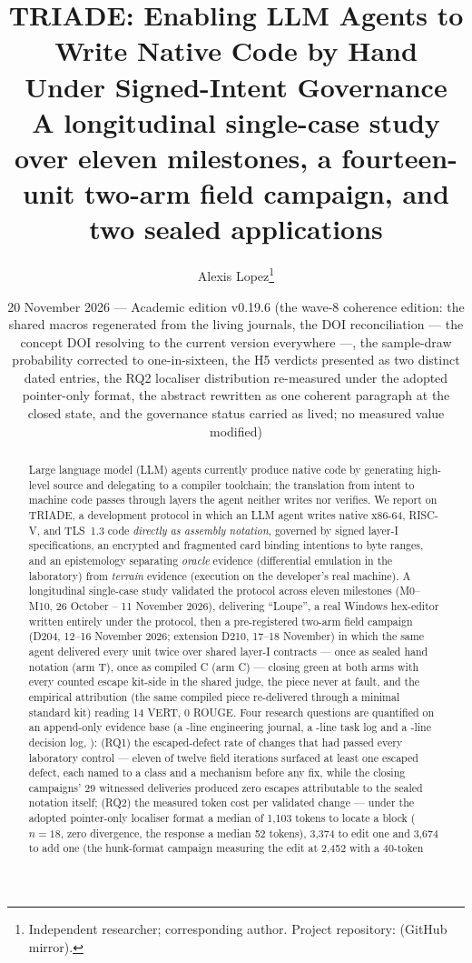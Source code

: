 \documentclass[11pt,a4paper]{article}
\title{\textbf{TRIADE: Enabling LLM Agents to Write Native Code by Hand\\
Under Signed-Intent Governance\\
\large A longitudinal single-case study over eleven milestones, a
fourteen-unit two-arm field campaign, and two sealed applications}}
\author{Alexis Lopez\thanks{Independent researcher; corresponding author.
Project repository: \code{alexisfrlopez-debug/triade} (GitHub mirror).}}
\date{20 November 2026 — Academic edition v0.19.6 (the wave-8 coherence edition: the shared macros regenerated from the living journals, the DOI reconciliation --- the concept DOI resolving to the current version everywhere ---, the sample-draw probability corrected to one-in-sixteen, the H5 verdicts presented as two distinct dated entries, the RQ2 localiser distribution re-measured under the adopted pointer-only format, the abstract rewritten as one coherent paragraph at the closed state, and the governance status carried as lived; no measured value modified)}
\begin{document}
\maketitle
\thispagestyle{fancy}

\begin{abstract}
\noindent Large language model (LLM) agents currently produce native code by
generating high-level source and delegating to a compiler toolchain; the
translation from intent to machine code passes through layers the agent
neither writes nor verifies. We report on TRIADE, a development protocol in
which an LLM agent writes native x86-64, RISC-V, and TLS~1.3 code
\emph{directly as assembly notation}, governed by signed layer-I
specifications, an encrypted and fragmented card binding intentions to byte
ranges, and an epistemology separating \emph{oracle} evidence (differential
emulation in the laboratory) from \emph{terrain} evidence (execution on the
developer's real machine). A longitudinal single-case study validated the
protocol across eleven milestones (M0--M10, 26 October -- 11 November 2026),
delivering ``Loupe'', a real Windows hex-editor written entirely under the
protocol, then a pre-registered two-arm field campaign (D204, 12--16
November 2026; extension D210, 17--18 November) in which the same agent
delivered every unit twice over shared layer-I contracts --- once as sealed
hand notation (arm T), once as compiled C (arm C) --- closing green at both
arms with every counted escape kit-side in the shared judge, the piece
never at fault, and the empirical attribution (the same compiled piece
re-delivered through a minimal standard kit) reading 14 VERT, 0 ROUGE.
Four research questions are quantified on an append-only evidence base
(a \nbLignesJournal-line engineering journal, a \nbLignesWorklog-line
task log and a \nbLignesDecisions-line decision log, \plageDecisions):
(RQ1) the escaped-defect rate of changes that had passed every laboratory
control --- eleven of twelve field iterations surfaced at least one escaped
defect, each named to a class and a mechanism before any fix, while the
closing campaigns' 29 witnessed deliveries produced zero escapes
attributable to the sealed notation itself; (RQ2) the measured token cost
per validated change --- under the adopted pointer-only localiser format a
median of 1{,}103 tokens to locate a block ($n{=}18$, zero divergence, the
response a median 52 tokens), 3{,}374 to edit one and 3{,}674 to add one
(the hunk-format campaign measuring the edit at 2{,}452 with a 40-token

\end{abstract}
\end{document}
